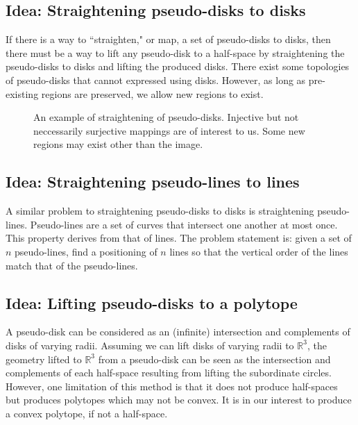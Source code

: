\documentclass{NSF}
\begin{document}
\subsection{Idea: Straightening pseudo-disks to disks}
If there is a way to ``straighten," or map, a set of pseudo-disks to disks, then there must be a way to lift any pseudo-disk to a half-space by straightening the pseudo-disks to disks and lifting the produced disks. There exist some topologies of pseudo-disks that cannot expressed using disks. However, as long as pre-existing regions are preserved, we allow new regions to exist.

\begin{figure}[ht]
\centering
{}
\caption{An example of straightening of pseudo-disks. Injective but not neccessarily surjective mappings are of interest to us. Some new regions may exist other than the image.}
\label{fig:topologically-impossible}
\end{figure}

\subsection{Idea: Straightening pseudo-lines to lines}
A similar problem to straightening pseudo-disks to disks is straightening pseudo-lines. Pseudo-lines are a set of curves that intersect one another at most once. This property derives from that of lines. The problem statement is:  given a set of $n$ pseudo-lines, find a positioning of $n$ lines so that the vertical order of the lines match that of the pseudo-lines.



\subsection{Idea: Lifting pseudo-disks to a polytope}
A pseudo-disk can be considered as an (infinite) intersection and complements of disks of varying radii. Assuming we can lift disks of varying radii to $\mathbb{R}^3$, the geometry lifted to $\mathbb{R}^3$  from a pseudo-disk can be seen as the intersection and complements of each half-space resulting from lifting the subordinate circles. However, one limitation of this method is that it does not produce half-spaces but produces polytopes which may not be convex. It is in our interest to produce a convex polytope, if not a half-space.
\end{document}
